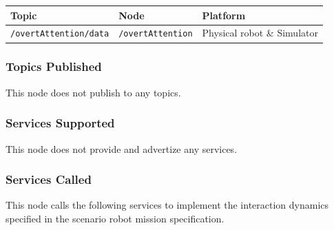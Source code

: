 \documentclass{CSSRforAfrica}
\begin{document}
\begin{center}
\begin{tabularx}{\linewidth}{| l | l | X|}
\hline 
{\small Topic }                               & {\small Node }                            &  {\small Platform}       \\
\hline
{\footnotesize \verb+/overtAttention/data+ }  & {\footnotesize \verb+/overtAttention+}    & {\small Physical robot \& Simulator  } \\ 
\hline
\end{tabularx}
\end{center}

\subsubsection*{Topics Published}
This node does not publish to any  topics.


\subsubsection*{Services Supported}

This node does not provide and advertize  any services.

\subsubsection*{Services Called}
\label{section:robot_mission_interpreter_services_called}

This node  calls the following services to implement the interaction dynamics specified in the scenario robot mission specification.
\end{document}
